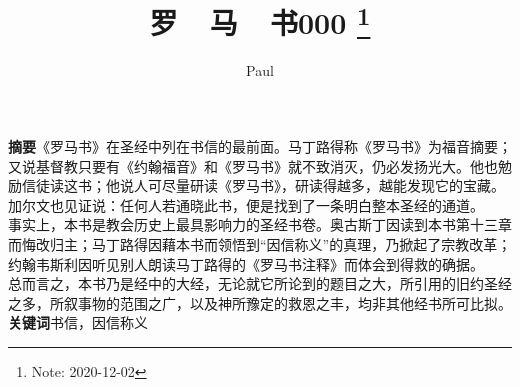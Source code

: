 \documentclass[a4paper,11pt,onecolumn,twoside]{ctexart}
\title{
	\huge{罗~~马~~书000}
	\thanks{Note: 2020-12-02}
}
\author{Paul}
\date{}  %
\begin{document}
\newcommand{\supercite}[1]{\textsuperscript{\cite{#1}}}
\maketitle
\setlength{\oddsidemargin}{ 1cm}  %
\setlength{\evensidemargin}{\oddsidemargin}
\setlength{\textwidth}{13.50cm}
\vspace{-.8cm}
\begin{center}
	\parbox{\textwidth}{\textbf{摘要}\quad  《罗马书》在圣经中列在书信的最前面。马丁路得称《罗马书》为福音摘要；又说基督教只要有《约翰福音》和《罗马书》就不致消灭，仍必发扬光大。他也勉励信徒读这书；他说人可尽量研读《罗马书》，研读得越多，越能发现它的宝藏。加尔文也见证说：任何人若通晓此书，便是找到了一条明白整本圣经的通道。\\事实上，本书是教会历史上最具影响力的圣经书卷。奥古斯丁因读到本书第十三章而悔改归主；马丁路得因藉本书而领悟到“因信称义”的真理，乃掀起了宗教改革；约翰韦斯利因听见别人朗读马丁路得的《罗马书注释》而体会到得救的确据。\\总而言之，本书乃是经中的大经，无论就它所论到的题目之大，所引用的旧约圣经之多，所叙事物的范围之广，以及神所豫定的救恩之丰，均非其他经书所可比拟。\\
		\textbf{关键词}\quad 书信，因信称义
}
\end{center}
\end{document}
